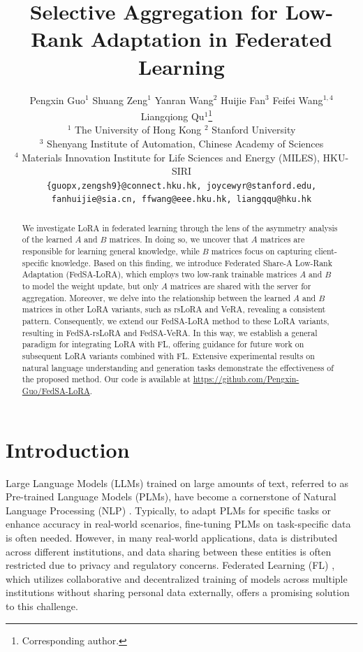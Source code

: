 \documentclass{article} %
\title{Selective Aggregation for Low-Rank Adaptation in Federated Learning}
\author{Pengxin Guo$^{1}$ Shuang Zeng$^{1}$ Yanran Wang$^{2}$ Huijie Fan$^{3}$ Feifei Wang$^{1,4}$ Liangqiong Qu$^{1}$\thanks{Corresponding author.}~~
\\
$^{1}$ The University of Hong Kong \quad $^{2}$ Stanford University \\
$^{3}$ Shenyang Institute of Automation, Chinese Academy of Sciences \\
$^{4}$ Materials Innovation Institute for Life Sciences and Energy (MILES), HKU-SIRI \\
\texttt{\{guopx,zengsh9\}@connect.hku.hk, joycewyr@stanford.edu,}\\
\texttt{fanhuijie@sia.cn, ffwang@eee.hku.hk, liangqqu@hku.hk} \\
}
\begin{document}
\maketitle

\begin{abstract}

We investigate LoRA in federated learning through the lens of the asymmetry analysis of the learned $A$ and $B$ matrices. In doing so, we uncover that $A$ matrices are responsible for learning general knowledge, while $B$ matrices focus on capturing client-specific knowledge. Based on this finding, we introduce Federated Share-A Low-Rank Adaptation (FedSA-LoRA), which employs two low-rank trainable matrices $A$ and $B$ to model the weight update, but only $A$ matrices are shared with the server for aggregation. Moreover, we delve into the relationship between the learned $A$ and $B$ matrices in other LoRA variants, such as rsLoRA and VeRA, revealing a consistent pattern. Consequently, we extend our FedSA-LoRA method to these LoRA variants, resulting in FedSA-rsLoRA and FedSA-VeRA. In this way, we establish a general paradigm for integrating LoRA with FL, offering guidance for future work on subsequent LoRA variants combined with FL. Extensive experimental results on natural language understanding and generation tasks demonstrate the effectiveness of the proposed method. Our code is available at \href{https://github.com/Pengxin-Guo/FedSA-LoRA}{https://github.com/Pengxin-Guo/FedSA-LoRA}.

\end{abstract}

\section{Introduction} \label{sec:intro}

Large Language Models (LLMs) trained on large amounts of text, referred to as Pre-trained Language Models (PLMs), have become a cornerstone of Natural Language Processing (NLP) \citep{brown2020language,touvron2023llama,achiam2023gpt,chowdhery2023palm}.
Typically, to adapt PLMs for specific tasks or enhance accuracy in real-world scenarios, fine-tuning PLMs on task-specific data is often needed. However, in many real-world applications, data is distributed across different institutions, and data sharing between these entities is often restricted due to privacy and regulatory concerns. 
Federated Learning (FL) \citep{mcmahan2017communication, li2020bfederated, zhang2021survey, kairouz2021advances}, which utilizes collaborative and decentralized training of models across multiple institutions without sharing personal data externally, offers a promising solution to this challenge.
\end{document}
